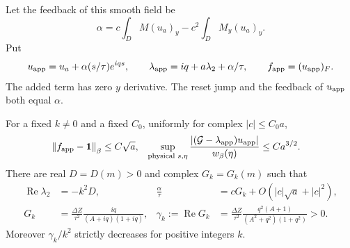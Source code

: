 Let the feedback of this smooth field be
\[
 \alpha=c\int_D M(u_a)_y-c^2\int_D M_y(u_a)_y.
\]
Put
\begin{equation}\label{eq:approx-mode}
 u_{\rm app}=u_a+\alpha(s/\tau)e^{iqs},\qquad
 \lambda_{\rm app}=iq+a\lambda_2+\alpha/\tau,\qquad
 f_{\rm app}=(u_{\rm app})_F.
\end{equation}
The added term has zero $y$ derivative. The reset jump and the feedback
of $u_{\rm app}$ both equal $\alpha$.

\begin{lemma}\label{lem:quasimode}
For a fixed $k\ne0$ and a fixed $C_0$, uniformly for complex
$|c|\le C_0a$,
\begin{align}
 \left\|f_{\rm app}-\mathbf 1\right\|_\beta&\le C\sqrt a,&
 \sup_{\text{physical }s,\eta}
       \frac{|(\mathcal G-\lambda_{\rm app})u_{\rm app}|}{w_\beta(\eta)}
       &\le Ca^{3/2}.                             \label{eq:mode-residual}
\end{align}
There are real $D=D(m)>0$ and complex $G_k=G_k(m)$ such that
\begin{align}
 \operatorname{Re}\lambda_2&=-k^2D,&
 \frac{\alpha}{\tau}&=cG_k+O(|c|\sqrt a+|c|^2),     \label{eq:mode-gain}\\
 G_k&=\frac{\Delta Z}{\tau^2}
           \frac{iq}{(A+iq)(1+iq)},&
 \gamma_k:=\operatorname{Re}G_k
   &=\frac{\Delta Z}{\tau^2}
       \frac{q^2(A+1)}{(A^2+q^2)(1+q^2)}>0.       \label{eq:gamma}
\end{align}
Moreover $\gamma_k/k^2$ strictly decreases for positive integers $k$.
\end{lemma}

